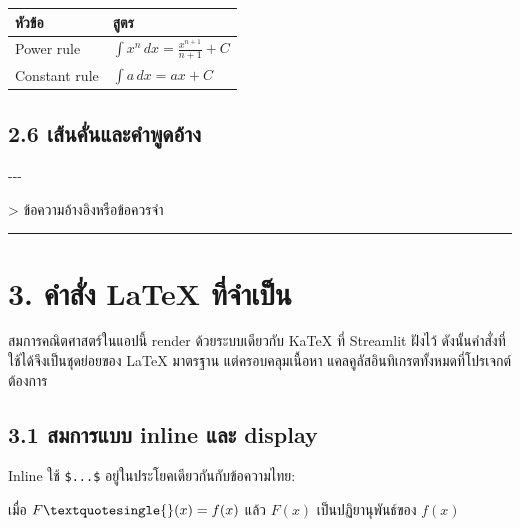 \documentclass[
  thai,
  12pt,
  letterpaper,
  DIV=11,
  numbers=noendperiod]{scrartcl}
\newenvironment{Shaded}{\begin{snugshade}}{\end{snugshade}}
\newcommand{\CommentTok}[1]{\textcolor[rgb]{0.37,0.37,0.37}{#1}}
\newcommand{\NormalTok}[1]{\textcolor[rgb]{0.00,0.23,0.31}{#1}}
\newcounter{none} %
\begin{document}
{\def\LTcaptype{none} %
\begin{longtable}[]{@{}ll@{}}
\toprule\noalign{}
หัวข้อ & สูตร \\
\midrule\noalign{}
\endhead
\bottomrule\noalign{}
\endlastfoot
Power rule & \(\int x^n\,dx = \frac{x^{n+1}}{n+1}+C\) \\
Constant rule & \(\int a\,dx = ax+C\) \\
\end{longtable}
}

\subsection{2.6
เส้นคั่นและคำพูดอ้าง}\label{uxe40uxe2auxe19uxe04uxe19uxe41uxe25uxe30uxe04uxe33uxe1euxe14uxe2duxe32uxe07}

\begin{Shaded}
\begin{Highlighting}[]
\CommentTok{{-}{-}{-}}

\CommentTok{\textgreater{} ข้อความอ้างอิงหรือข้อควรจำ}
\end{Highlighting}
\end{Shaded}

\begin{center}\rule{0.5\linewidth}{0.5pt}\end{center}

\section{3. คำสั่ง LaTeX
ที่จำเป็น}\label{uxe04uxe33uxe2auxe07-latex-uxe17uxe08uxe33uxe40uxe1buxe19}

สมการคณิตศาสตร์ในแอปนี้ render ด้วยระบบเดียวกับ KaTeX ที่ Streamlit ฝังไว้
ดังนั้นคำสั่งที่ใช้ได้จึงเป็นชุดย่อยของ LaTeX มาตรฐาน แต่ครอบคลุมเนื้อหา
แคลคูลัสอินทิเกรตทั้งหมดที่โปรเจกต์ต้องการ

\subsection{3.1 สมการแบบ inline และ
display}\label{uxe2auxe21uxe01uxe32uxe23uxe41uxe1auxe1a-inline-uxe41uxe25uxe30-display}

Inline ใช้ \texttt{\$...\$} อยู่ในประโยคเดียวกันกับข้อความไทย:

\begin{Shaded}
\begin{Highlighting}[]
\NormalTok{เมื่อ $F\textquotesingle{}(x)=f(x)$ แล้ว $F(x)$ เป็นปฏิยานุพันธ์ของ $f(x)$}
\end{Highlighting}
\end{Shaded}
\end{document}
